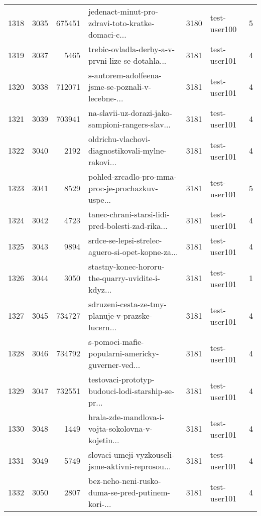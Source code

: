 \begin{tabular}{lrrlrlr}
1318 &       3035 &   675451 &  jedenact-minut-pro-zdravi-toto-kratke-domaci-c... &     3180 &                 test-user100 &               5 \\
1319 &       3037 &     5465 &  trebic-ovladla-derby-a-v-prvni-lize-se-dotahla... &     3181 &                 test-user101 &               4 \\
1320 &       3038 &   712071 &  s-autorem-adolfeena-jsme-se-poznali-v-lecebne-... &     3181 &                 test-user101 &               4 \\
1321 &       3039 &   703941 &  na-slavii-uz-dorazi-jako-sampioni-rangers-slav... &     3181 &                 test-user101 &               4 \\
1322 &       3040 &     2192 &  oldrichu-vlachovi-diagnostikovali-mylne-rakovi... &     3181 &                 test-user101 &               4 \\
1323 &       3041 &     8529 &  pohled-zrcadlo-pro-mma-proc-je-prochazkuv-uspe... &     3181 &                 test-user101 &               5 \\
1324 &       3042 &     4723 &  tanec-chrani-starsi-lidi-pred-bolesti-zad-rika... &     3181 &                 test-user101 &               4 \\
1325 &       3043 &     9894 &  srdce-se-lepsi-strelec-aguero-si-opet-kopne-za... &     3181 &                 test-user101 &               4 \\
1326 &       3044 &     3050 &  stastny-konec-hororu-the-quarry-uvidite-i-kdyz... &     3181 &                 test-user101 &               1 \\
1327 &       3045 &   734727 &  sdruzeni-cesta-ze-tmy-planuje-v-prazske-lucern... &     3181 &                 test-user101 &               4 \\
1328 &       3046 &   734792 &  s-pomoci-mafie-popularni-americky-guverner-ved... &     3181 &                 test-user101 &               4 \\
1329 &       3047 &   732551 &  testovaci-prototyp-budouci-lodi-starship-se-pr... &     3181 &                 test-user101 &               4 \\
1330 &       3048 &     1449 &  hrala-zde-mandlova-i-vojta-sokolovna-v-kojetin... &     3181 &                 test-user101 &               4 \\
1331 &       3049 &     5749 &  slovaci-umeji-vyzkouseli-jsme-aktivni-reprosou... &     3181 &                 test-user101 &               4 \\
1332 &       3050 &     2807 &  bez-neho-neni-rusko-duma-se-pred-putinem-kori-... &     3181 &                 test-user101 &               4 \\

\end{tabular}
